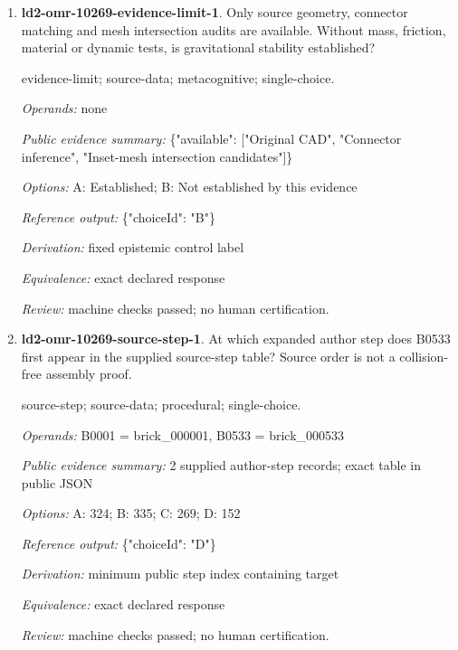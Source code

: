 \begin{enumerate}
\par{\small coverage; source-data; metacognitive; single-choice.\par\textit{Operands:} B0487 = brick\_000487, B0802 = brick\_000802, B0626 = brick\_000626, B0256 = brick\_000256\par\textit{Public evidence summary:} \{"coverage": [\{"label": "B0802", "supported": true\}, \{"label": "B0626", "supported": true\}, \{"label": "B0487", "supported": true\}, \{"label": "B0256", "supported": false\}]\}\par\textit{Options:} A: B0802; B: B0487; C: B0256; D: B0626\par\textit{Reference output:} \{"choiceId": "C"\}\par\textit{Derivation:} public supported=false record\par\textit{Equivalence:} exact declared response\par\textit{Review:} pending required human review.}
\item \textbf{ld2-omr-10269-evidence-limit-1}. Only source geometry, connector matching and mesh intersection audits are available. Without mass, friction, material or dynamic tests, is gravitational stability established?
\par{\small evidence-limit; source-data; metacognitive; single-choice.\par\textit{Operands:} none\par\textit{Public evidence summary:} \{"available": ["Original CAD", "Connector inference", "Inset-mesh intersection candidates"]\}\par\textit{Options:} A: Established; B: Not established by this evidence\par\textit{Reference output:} \{"choiceId": "B"\}\par\textit{Derivation:} fixed epistemic control label\par\textit{Equivalence:} exact declared response\par\textit{Review:} machine checks passed; no human certification.}
\item \textbf{ld2-omr-10269-source-step-1}. At which expanded author step does B0533 first appear in the supplied source-step table? Source order is not a collision-free assembly proof.
\par{\small source-step; source-data; procedural; single-choice.\par\textit{Operands:} B0001 = brick\_000001, B0533 = brick\_000533\par\textit{Public evidence summary:} 2 supplied author-step records; exact table in public JSON\par\textit{Options:} A: 324; B: 335; C: 269; D: 152\par\textit{Reference output:} \{"choiceId": "D"\}\par\textit{Derivation:} minimum public step index containing target\par\textit{Equivalence:} exact declared response\par\textit{Review:} machine checks passed; no human certification.}

\end{enumerate}
